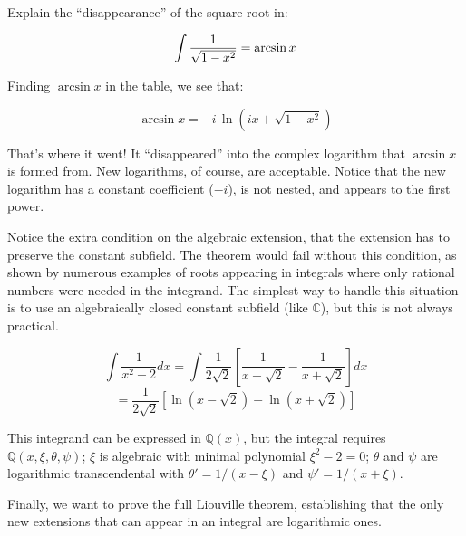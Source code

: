 Explain the ``disappearance'' of the square root in:

$$\int{1\over\sqrt{1-x^2}} = \arcsin x$$

Finding $\arcsin x$ in the table, we see that:

$$\arcsin x = -i \,\ln (ix + \sqrt{1-x^2})$$

That's where it went!  It ``disappeared'' into the complex logarithm
that $\arcsin x$ is formed from.  New logarithms, of course, are
acceptable.  Notice that the new logarithm has a constant coefficient
($-i$), is not nested, and appears to the first power.

\endexample

Notice the extra condition on the algebraic extension, that the
extension has to preserve the constant subfield.  The theorem would
fail without this condition, as shown by numerous examples of roots
appearing in integrals where only rational numbers were needed in the
integrand.  The simplest way to handle this situation is to use an
algebraically closed constant subfield (like ${\mathbb C}$), but
this is not always practical.

\example

$$\int \frac{1}{x^2-2} dx = \int \frac{1}{2\sqrt{2}} \left[ \frac{1}{x-\sqrt{2}} - \frac{1}{x+\sqrt{2}} \right] dx$$
$$= \frac{1}{2\sqrt{2}} \left[ \ln(x-\sqrt{2}) - \ln(x+\sqrt{2}) \right]$$

This integrand can be expressed in ${\mathbb Q}(x)$, but the integral
requires ${\mathbb Q}(x,\xi,\theta,\psi)$; $\xi$ is algebraic
with minimal polynomial $\xi^2-2=0$; $\theta$ and $\psi$ are
logarithmic transcendental with $\theta' = 1/(x-\xi)$
and $\psi' = 1/(x+\xi)$.

\endexample

Finally, we want to prove the full Liouville theorem, establishing
that the only new extensions that can appear in an integral are
logarithmic ones.

\begin{comment}
This is a major tool in our program of symbolic
integration, since it severely limits the possible extensions that
need to be searched for an integral.  Indeed, if we could not
limit the appear of new extensions, it is unlikely that we
could completely and systemically evaluate integrals.

The structure theorems above already establish a simplified version of
the Liouville theorem for single extensions.  We need a version of the
Liouville theorem that holds over any number of extensions, so
an induction step is required.
\end{comment}

